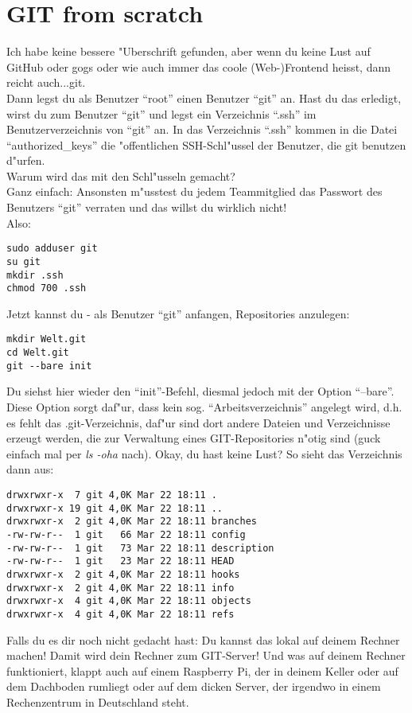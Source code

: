 \documentclass[german,a4paper]{report}
\begin{document}
\section{GIT from scratch}
Ich habe keine bessere "Uberschrift gefunden, aber wenn du keine Lust auf GitHub oder gogs oder
wie auch immer das coole (Web-)Frontend heisst, dann reicht auch...git.\\
Dann legst du als Benutzer ``root'' einen Benutzer ``git'' an. Hast du das erledigt, wirst
du zum Benutzer ``git'' und legst ein Verzeichnis ``.ssh'' im Benutzerverzeichnis von ``git''
an. In das Verzeichnis ``.ssh'' kommen in die Datei ``authorized\_keys'' die "offentlichen
SSH-Schl"ussel der Benutzer, die git benutzen d"urfen.\\
Warum wird das mit den Schl"usseln gemacht?\\
Ganz einfach: Ansonsten m"usstest du jedem Teammitglied das Passwort des Benutzers ``git''
verraten und das willst du wirklich nicht!\\
Also:
\begin{verbatim}
sudo adduser git
su git
mkdir .ssh
chmod 700 .ssh
\end{verbatim}
Jetzt kannst du - als Benutzer ``git'' anfangen, Repositories anzulegen:
\begin{verbatim}
mkdir Welt.git
cd Welt.git
git --bare init
\end{verbatim}
Du siehst hier wieder den ``init''-Befehl, diesmal jedoch mit der Option ``--bare''. Diese
Option sorgt daf"ur, dass kein sog. ``Arbeitsverzeichnis'' angelegt wird, d.h. es fehlt das
.git-Verzeichnis, daf"ur sind dort andere Dateien und Verzeichnisse erzeugt werden, die
zur Verwaltung eines GIT-Repositories n"otig sind (guck einfach mal per \textit{ls -oha} nach).
Okay, du hast keine Lust? So sieht das Verzeichnis dann aus:
\begin{verbatim}
drwxrwxr-x  7 git 4,0K Mar 22 18:11 .
drwxrwxr-x 19 git 4,0K Mar 22 18:11 ..
drwxrwxr-x  2 git 4,0K Mar 22 18:11 branches
-rw-rw-r--  1 git   66 Mar 22 18:11 config
-rw-rw-r--  1 git   73 Mar 22 18:11 description
-rw-rw-r--  1 git   23 Mar 22 18:11 HEAD
drwxrwxr-x  2 git 4,0K Mar 22 18:11 hooks
drwxrwxr-x  2 git 4,0K Mar 22 18:11 info
drwxrwxr-x  4 git 4,0K Mar 22 18:11 objects
drwxrwxr-x  4 git 4,0K Mar 22 18:11 refs
\end{verbatim}
Falls du es dir noch nicht gedacht hast: Du kannst das lokal auf deinem Rechner machen! Damit
wird dein Rechner zum GIT-Server! Und was auf deinem Rechner funktioniert, klappt auch auf
einem Raspberry Pi, der in deinem Keller oder auf dem Dachboden rumliegt oder auf dem
dicken Server, der irgendwo in einem Rechenzentrum in Deutschland steht.
\end{document}
